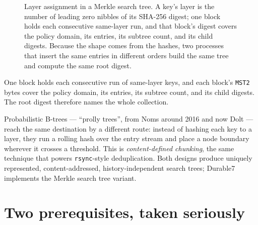 \documentclass[11pt,twoside,openright]{book}
\newcommand{\code}[1]{\texorpdfstring{\textcolor{d7ink}{\texttt{#1}}}{#1}}
\newcommand{\term}[1]{\textit{#1}}
\begin{document}
\begin{figure}[htbp]
\centering
{}
\caption{Layer assignment in a Merkle search tree. A key's layer is the number
of leading zero nibbles of its SHA-256 digest; one block holds each consecutive
same-layer run, and that block's digest covers the policy domain, its entries,
its subtree count, and its child digests. Because the shape comes from the
hashes, two processes that insert the same entries in different orders build the
same tree and compute the same root digest.}
\label{fig:mst}
\end{figure}

One block holds each consecutive run of same-layer keys, and each block's
\code{MST2} bytes cover the policy domain, its entries, its subtree count, and
its child digests. The root digest therefore names the whole collection.

\begin{asidebox}
Probabilistic B-trees --- ``prolly trees'', from Noms around 2016 and now Dolt
--- reach the same destination by a different route: instead of hashing each key
to a layer, they run a rolling hash over the entry stream and place a node
boundary wherever it crosses a threshold. This is \term{content-defined
chunking}, the same technique that powers \code{rsync}-style deduplication.
Both designs produce uniquely represented, content-addressed, history-independent
search trees; Durable7 implements the Merkle search tree variant.
\end{asidebox}

\section{Two prerequisites, taken seriously}
\end{document}
